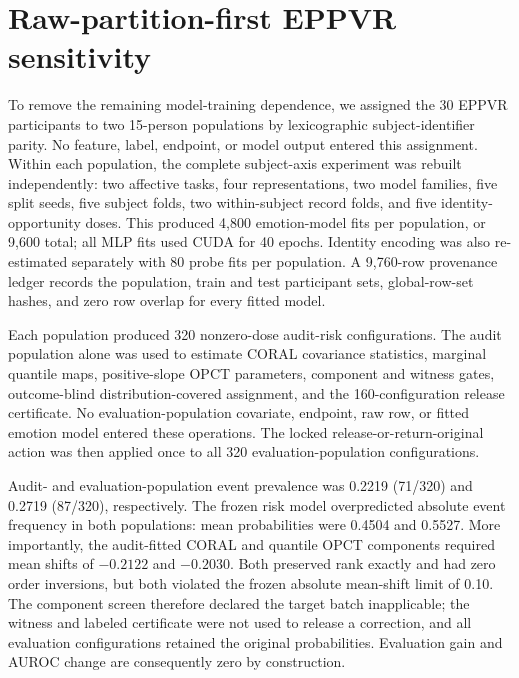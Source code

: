 \documentclass[preprint,12pt]{elsarticle}
\begin{document}
\section{Raw-partition-first EPPVR sensitivity}

To remove the remaining model-training dependence, we assigned the 30 EPPVR participants to two 15-person populations by lexicographic subject-identifier parity. No feature, label, endpoint, or model output entered this assignment. Within each population, the complete subject-axis experiment was rebuilt independently: two affective tasks, four representations, two model families, five split seeds, five subject folds, two within-subject record folds, and five identity-opportunity doses. This produced 4,800 emotion-model fits per population, or 9,600 total; all MLP fits used CUDA for 40 epochs. Identity encoding was also re-estimated separately with 80 probe fits per population. A 9,760-row provenance ledger records the population, train and test participant sets, global-row-set hashes, and zero row overlap for every fitted model.

Each population produced 320 nonzero-dose audit-risk configurations. The audit population alone was used to estimate CORAL covariance statistics, marginal quantile maps, positive-slope OPCT parameters, component and witness gates, outcome-blind distribution-covered assignment, and the 160-configuration release certificate. No evaluation-population covariate, endpoint, raw row, or fitted emotion model entered these operations. The locked release-or-return-original action was then applied once to all 320 evaluation-population configurations.



Audit- and evaluation-population event prevalence was 0.2219 (71/320) and 0.2719 (87/320), respectively. The frozen risk model overpredicted absolute event frequency in both populations: mean probabilities were 0.4504 and 0.5527. More importantly, the audit-fitted CORAL and quantile OPCT components required mean shifts of $-0.2122$ and $-0.2030$. Both preserved rank exactly and had zero order inversions, but both violated the frozen absolute mean-shift limit of 0.10. The component screen therefore declared the target batch inapplicable; the witness and labeled certificate were not used to release a correction, and all evaluation configurations retained the original probabilities. Evaluation gain and AUROC change are consequently zero by construction.
\end{document}
